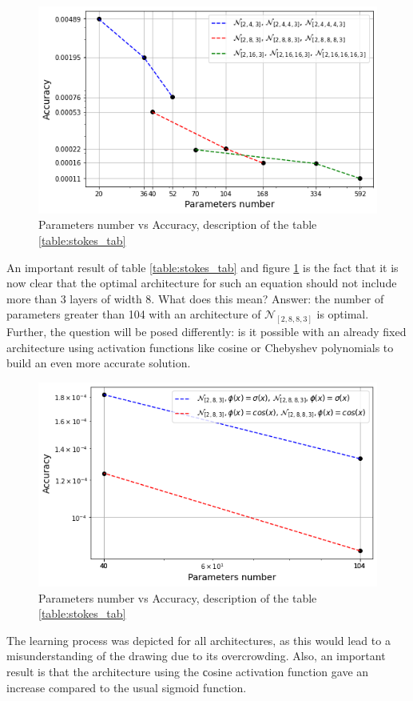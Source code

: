 \begin{figure}
	\centering
	\includegraphics[width=\textwidth]{images/chapter3/stokes_simple_nets_description.png}
	\caption{Parameters number vs Accuracy, description of the table \ref{table:stokes_tab}}
	\label{fig:stokes_simple_nets_description}\tabularnewline
\end{figure}

An important result of table \ref{table:stokes_tab} and figure \ref{fig:stokes_simple_nets_description} is the fact that it is now clear that the optimal architecture for such an equation should not include more than 3 layers of width 8. What does this mean? Answer: the number of parameters greater than 104 with an architecture of $\mathcal{N}_{[2, 8, 8, 3]}$ is optimal. Further, the question will be posed differently: is it possible with an already fixed architecture using activation functions like cosine or Chebyshev polynomials to build an even more accurate solution.

\begin{figure}
	\centering
	\includegraphics[width=\textwidth]{images/chapter3/stokes_simple_nets_cos.png}
	\caption{Parameters number vs Accuracy, description of the table \ref{table:stokes_tab}}
	\label{fig:stokes_simple_nets_cos}\tabularnewline
\end{figure}

The learning process was depicted for all architectures, as this would lead to a misunderstanding of the drawing due to its overcrowding. Also, an important result is that the architecture using the сosine activation function gave an increase compared to the usual sigmoid function. 